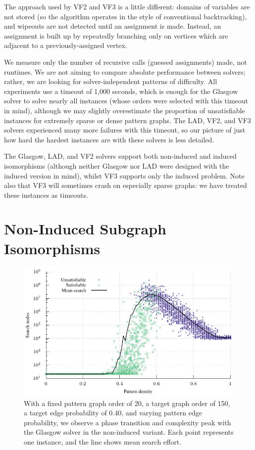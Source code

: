 \documentclass[twoside,11pt]{article}
\begin{document}
The approach used by VF2 and VF3 is a little different: domains of variables are not stored (so the
algorithm operates in the style of conventional backtracking), and wipeouts are not detected until
an assignment is made. Instead, an assignment is built up by repeatedly branching only on vertices
which are adjacent to a previously-assigned vertex.

We measure only the number of recursive calls (guessed assignments) made, not runtimes. We are not
aiming to compare absolute performance between solvers; rather, we are looking for
solver-independent patterns of difficulty. All experiments use a timeout of 1,000 seconds, which is
enough for the Glasgow solver to solve nearly all instances (whose orders were selected with this
timeout in mind), although we may slightly overestimate the proportion of unsatisfiable instances
for extremely sparse or dense pattern graphs. The LAD, VF2, and VF3 solvers experienced many more
failures with this timeout, so our picture of just how hard the hardest instances are with these
solvers is less detailed.

The Glasgow, LAD, and VF2 solvers support both non-induced and induced isomorphisms (although
neither Glasgow nor LAD were designed with the induced version in mind), whilst VF3 supports only
the induced problem. Note also that VF3 will sometimes crash on especially sparse graphs: we have
treated these instances as timeouts.

\section{Non-Induced Subgraph Isomorphisms}\label{section:non-induced}

\begin{figure}[t]
    \centering
    \includegraphics*{plots/phase-transition.pdf}

    \caption{With a fixed pattern graph order of 20, a target graph order of 150, a target edge
        probability of 0.40, and varying pattern edge probability, we observe a phase transition and
        complexity peak with the Glasgow solver in the non-induced variant. Each point represents
        one instance, and the line shows mean search effort.}
    \label{figure:phase-transition}
\end{figure}
\end{document}
